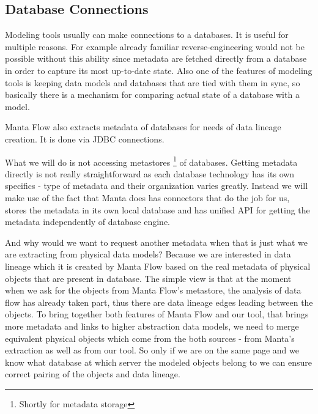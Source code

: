 
\subsection{Database Connections}

Modeling tools usually can make connections to a databases. It is useful for multiple reasons. For example already familiar reverse-engineering would not be possible without this ability since metadata are fetched directly from a database in order to capture its most up-to-date state. Also one of the features of modeling tools is keeping data models and databases that are tied with them in sync, so basically there is a mechanism for comparing actual state of a database with a model. 

Manta Flow also extracts metadata of databases for needs of data lineage creation. It is done via JDBC connections.

What we will do is not accessing metastores \footnote{Shortly for metadata storage} of databases. Getting metadata directly is not really straightforward as each database technology has its own specifics - type of metadata and their organization varies greatly. Instead we will make use of the fact that Manta does has connectors that do the job for us, stores the metadata in its own local database and has unified API for getting the metadata independently of database engine. 

And why would we want to request another metadata when that is just what we are extracting from physical data models? \label{matching_physical_objects}
Because we are interested in data lineage which it is created by Manta Flow based on the real metadata of physical objects that are present in database.
The simple view is that at the moment when we ask for the objects from Manta Flow's metastore, the analysis of data flow has already taken part, thus there are data lineage edges leading between the objects. To bring together both features of Manta Flow and our tool, that brings more metadata and links to higher abstraction data models, we need to merge equivalent physical objects which come from the both sources - from Manta's extraction as well as from our tool. 
So only if we are on the same page and we know what database at which server the modeled objects belong to we can ensure correct pairing of the objects and data lineage. \\

